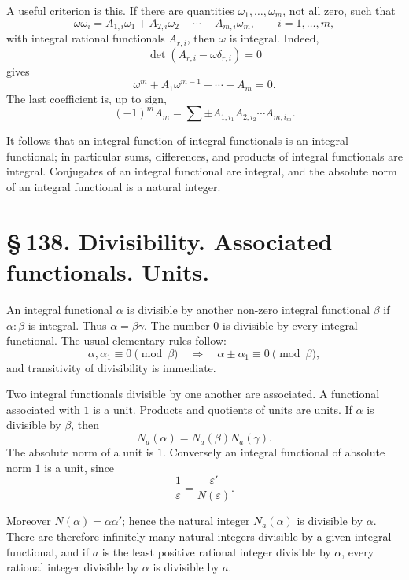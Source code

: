 \documentclass[11pt]{article}
\begin{document}
A useful criterion is this. If there are quantities
\(\omega_1,\ldots,\omega_m\), not all zero, such that
\begin{equation}
\omega\omega_i=A_{1,i}\omega_1+A_{2,i}\omega_2+\cdots+A_{m,i}\omega_m,
\qquad i=1,\ldots,m,
\tag{5}
\end{equation}
with integral rational functionals \(A_{r,i}\), then \(\omega\) is
integral. Indeed,
\[
\det(A_{r,i}-\omega\delta_{r,i})=0
\tag{6}
\]
gives
\[
\omega^m+A_1\omega^{m-1}+\cdots+A_m=0.
\tag{7}
\]
The last coefficient is, up to sign,
\[
(-1)^mA_m=\sum \pm A_{1,i_1}A_{2,i_2}\cdots A_{m,i_m}.
\tag{8}
\]

It follows that an integral function of integral functionals is an
integral functional; in particular sums, differences, and products of
integral functionals are integral. Conjugates of an integral
functional are integral, and the absolute norm of an integral
functional is a natural integer.

\section*{\S\,138. Divisibility. Associated functionals. Units.}

An integral functional \(\alpha\) is divisible by another non-zero
integral functional \(\beta\) if \(\alpha:\beta\) is integral. Thus
\(\alpha=\beta\gamma\). The number \(0\) is divisible by every
integral functional. The usual elementary rules follow:
\[
\alpha,\alpha_1\equiv 0\pmod{\beta}\quad\Rightarrow\quad
\alpha\pm\alpha_1\equiv 0\pmod{\beta},
\]
and transitivity of divisibility is immediate.

Two integral functionals divisible by one another are associated. A
functional associated with \(1\) is a unit. Products and quotients of
units are units. If \(\alpha\) is divisible by \(\beta\), then
\begin{equation}
N_a(\alpha)=N_a(\beta)N_a(\gamma).
\tag{1}
\end{equation}
The absolute norm of a unit is \(1\). Conversely an integral
functional of absolute norm \(1\) is a unit, since
\[
\frac1{\varepsilon}=\frac{\varepsilon'}{N(\varepsilon)}.
\]

Moreover \(N(\alpha)=\alpha\alpha'\); hence the natural integer
\(N_a(\alpha)\) is divisible by \(\alpha\). There are therefore
infinitely many natural integers divisible by a given integral
functional, and if \(a\) is the least positive rational integer
divisible by \(\alpha\), every rational integer divisible by
\(\alpha\) is divisible by \(a\).
\end{document}

